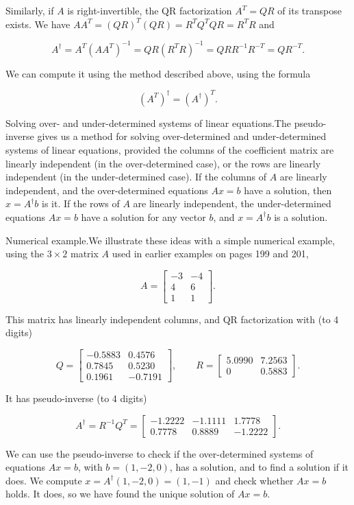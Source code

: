 Similarly, if \(A\) is right-invertible, the QR factorization \(A^{T}=QR\) of its transpose exists. We have \(AA^{T}=(QR)^{T}(QR)=R^{T}Q^{T}QR=R^{T}R\) and

\[A^{\dagger}=A^{T}(AA^{T})^{-1}=QR(R^{T}R)^{-1}=QRR^{-1}R^{-T}=QR^{-T}.\]

We can compute it using the method described above, using the formula

\[(A^{T})^{\dagger}=(A^{\dagger})^{T}.\]

Solving over- and under-determined systems of linear equations.The pseudo-inverse gives us a method for solving over-determined and under-determined systems of linear equations, provided the columns of the coefficient matrix are linearly independent (in the over-determined case), or the rows are linearly independent (in the under-determined case). If the columns of \(A\) are linearly independent, and the over-determined equations \(Ax=b\) have a solution, then \(x=A^{\dagger}b\) is it. If the rows of \(A\) are linearly independent, the under-determined equations \(Ax=b\) have a solution for any vector \(b\), and \(x=A^{\dagger}b\) is a solution.

Numerical example.We illustrate these ideas with a simple numerical example, using the \(3\times 2\) matrix \(A\) used in earlier examples on pages 199 and 201,

\[A=\left[\begin{array}{cc}-3&-4\\ 4&6\\ 1&1\end{array}\right].\]

This matrix has linearly independent columns, and QR factorization with (to 4 digits)

\[Q=\left[\begin{array}{cc}-0.5883&0.4576\\ 0.7845&0.5230\\ 0.1961&-0.7191\end{array}\right],\qquad R=\left[\begin{array}{cc}5.0990&7.25 63\\ 0&0.5883\end{array}\right].\]

It has pseudo-inverse (to 4 digits)

\[A^{\dagger}=R^{-1}Q^{T}=\left[\begin{array}{cc}-1.2222&-1.1111&1.7778\\ 0.7778&0.8889&-1.2222\end{array}\right].\]

We can use the pseudo-inverse to check if the over-determined systems of equations \(Ax=b\), with \(b=(1,-2,0)\), has a solution, and to find a solution if it does. We compute \(x=A^{\dagger}(1,-2,0)=(1,-1)\) and check whether \(Ax=b\) holds. It does, so we have found the unique solution of \(Ax=b\).

 